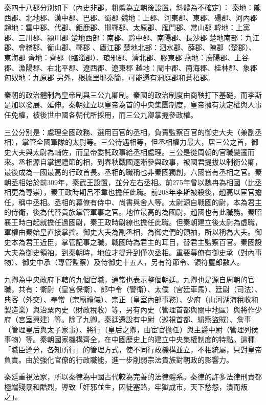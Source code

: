 秦四十八郡分別如下（內史非郡，粗體為立朝後設置，斜體為不確定）：
秦地：隴西郡、北地郡、漢中郡、巴郡、蜀郡
魏地：上郡、河東郡、東郡、碭郡、河內郡
趙地：雲中郡、代郡、鉅鹿郡、邯鄲郡、太原郡、雁門郡、常山郡
韓地：上黨郡、三川郡、潁川郡
楚地西部：南郡、黔中郡、南陽郡、長沙郡
楚地南部：九江郡、會稽郡、衡山郡、鄣郡 、廬江郡
楚地北部：泗水郡、薛郡、陳郡（楚郡）、東海郡
齊地：齊郡（臨淄郡）、琅邪郡、濟北郡、膠東郡
燕地：廣陽郡、上谷郡、漁陽郡、右北平郡、遼西郡、遼東郡
越地：閩中郡、南海郡、桂林郡、象郡
匈奴地：九原郡
另外，根據里耶秦簡，可能還有洞庭郡和蒼梧郡。

秦朝的政治體制為皇帝制與三公九卿制。秦國的政治制度由商鞅打下基礎，而李斯是加以發展、延伸。秦朝建立以皇帝為首的中央集團制度，皇帝擁有決定權與人事任免權，被後世中國各朝代所採用，而三公九卿掌握參政權。

三公分別是：處理全國政務、選用百官的丞相，負責監察百官的御史大夫（兼副丞相），掌管全國軍隊的太尉等。三公待遇相等，但丞相權力最大，居三公之首，御史大夫與太尉為輔佐，而皇帝委託政事給丞相處理。三公是從周朝的官職變遷而來。丞相源自掌握禮節的相，到春秋戰國逐漸參與政事，被國君提拔以制衡公卿，最後成為一國最高的行政首長。丞相的職稱也非秦國獨創，六國皆有丞相之官。秦朝丞相始於前309年，秦武王設置，並分左右丞相。前275年曾以魏冉為相國（比丞相更為尊崇），秦王政時期呂不韋也擔任此職。前208年李斯被殺後，趙高以宦官擔任，稱中丞相。丞相的幕僚有侍中、尚書與舍人等。太尉源自戰國的尉，本為君主的侍衛，後為代替貴族掌管軍事之官。地位最高的為國尉，趙國也有此職務。秦昭襄王時白起就擔任過國尉，秦王政時尉繚也擔任此職。但秦朝建立後太尉為虛職，軍權由秦始皇直接掌控。御史大夫為副丞相，為御史們的領袖，所以稱為大夫。御史本為君王近臣，掌管記事之職，戰國時為君主的耳目，替君主監察百官。秦國設大夫為御史領袖，到秦朝時，地位才提升到僅次丞相。重要幕僚有御史承（對內事物）、御史中承（專管監察）及侍御史十五人，另有符節令、領符璽郎數人。

九卿為中央政府下轄的九個官職，通常也表示整個朝廷。九卿也是源自周朝的官職，共有：衛尉（皇宮保衛）、郎中令（警衛）、太僕（宮廷車馬）、廷尉（司法）、典客（外交）、奉常（宗廟禮儀）、宗正（皇室內部事務）、少府（山河湖海稅收和製造業）與治粟內史（財政稅收）等，另有內史（管理首都與關中地區）與將作少府（宮室興建）等。除了九卿，秦廷還設有中尉（巡視首都、緝察盜賊）、詹事（管理皇后與太子家事）、將行（皇后之卿，由宦官擔任）與主爵中尉（管理列侯事物）等。秦朝國家機構齊全，在中國歷史上的建立中央集權制度的特點。這種「職臣遵分，各知所行」的管理方式，使不同行政機構並立，不相統屬，只對皇帝負責。由於強化官僚的行政職能，進一步削弱宗法貴族對朝政的影響力。

秦廷重視法家，所以秦律為中國古代較為完善的法律體系。秦律的許多法律刑責都極端殘暴和酷烈，導致「奸邪並生，囚徒塞路，牢獄成市，天下愁怨，潰而叛之」。

